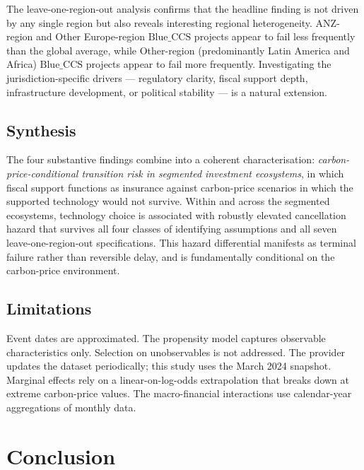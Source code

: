 \documentclass[11pt,a4paper]{article}
\newcommand{\BlueCCS}{\mathrm{Blue\_CCS}}
\begin{document}
The leave-one-region-out analysis confirms that the headline finding is not driven by any single region but also reveals interesting regional heterogeneity. ANZ-region and Other Europe-region $\BlueCCS$ projects appear to fail less frequently than the global average, while Other-region (predominantly Latin America and Africa) $\BlueCCS$ projects appear to fail more frequently. Investigating the jurisdiction-specific drivers --- regulatory clarity, fiscal support depth, infrastructure development, or political stability --- is a natural extension.

\subsection{Synthesis}

The four substantive findings combine into a coherent characterisation: \emph{carbon-price-conditional transition risk in segmented investment ecosystems}, in which fiscal support functions as insurance against carbon-price scenarios in which the supported technology would not survive. Within and across the segmented ecosystems, technology choice is associated with robustly elevated cancellation hazard that survives all four classes of identifying assumptions and all seven leave-one-region-out specifications. This hazard differential manifests as terminal failure rather than reversible delay, and is fundamentally conditional on the carbon-price environment.

\subsection{Limitations}

Event dates are approximated. The propensity model captures observable characteristics only. Selection on unobservables is not addressed. The provider updates the dataset periodically; this study uses the March 2024 snapshot. Marginal effects rely on a linear-on-log-odds extrapolation that breaks down at extreme carbon-price values. The macro-financial interactions use calendar-year aggregations of monthly data.

\section{Conclusion}
\end{document}
